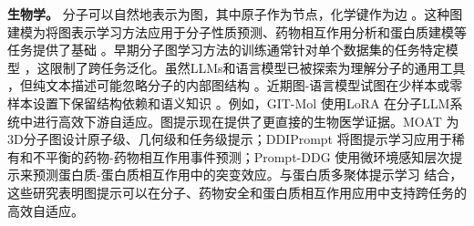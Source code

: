 \textbf{生物学。} 分子可以自然地表示为图，其中原子作为节点，化学键作为边 \cite{rong2020selfsupervised}。这种图建模为将图表示学习方法应用于分子性质预测、药物相互作用分析和蛋白质建模等任务提供了基础 \cite{rong2020selfsupervised, liu2023molca, zhao2023gimlet, edwards2023synergpt}。早期分子图学习方法的训练通常针对单个数据集的任务特定模型 \cite{rong2020selfsupervised, sun2020infograph}，这限制了跨任务泛化。虽然LLMs和语言模型已被探索为理解分子的通用工具 \cite{qian2023can, liu2023one}，但纯文本描述可能忽略分子的内部图结构 \cite{zhang2023large}。近期图-语言模型试图在少样本或零样本设置下保留结构依赖和语义知识 \cite{zhao2023gimlet, edwards2023synergpt}。例如，GIT-Mol \cite{liu2023gitmol} 使用LoRA \cite{hu2021lora} 在分子LLM系统中进行高效下游自适应。图提示现在提供了更直接的生物医学证据。MOAT \cite{long2024moat} 为3D分子图设计原子级、几何级和任务级提示；DDIPrompt \cite{wang2024ddiprompt} 将图提示学习应用于稀有和不平衡的药物-药物相互作用事件预测；Prompt-DDG \cite{wu2024promptddg} 使用微环境感知层次提示来预测蛋白质-蛋白质相互作用中的突变效应。与蛋白质多聚体提示学习 \cite{gao2024protein} 结合，这些研究表明图提示可以在分子、药物安全和蛋白质相互作用应用中支持跨任务的高效自适应。
